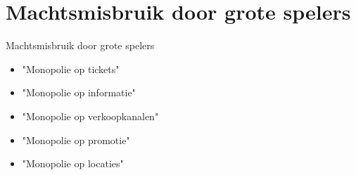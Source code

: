 \documentclass{beamer}
\begin{document}
\section{Machtsmisbruik door grote spelers}
\begin{frame}{Machtsmisbruik door grote spelers}
    \begin{itemize}
        \item "Monopolie op tickets"
        \item "Monopolie op informatie"
        \item "Monopolie op verkoopkanalen"
        \item "Monopolie op promotie"
        \item "Monopolie op locaties"
    \end{itemize}
\end{frame}
    
    
    
    
\end{document}

